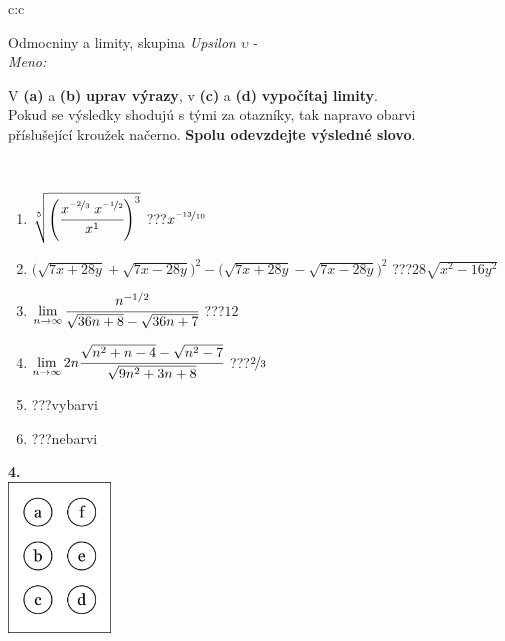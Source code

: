 \documentclass[10pt]{report}
\begin{document}
\begin{tabular}{c:c}
\begin{minipage}[c][104.5mm][t]{0.5\linewidth}
\begin{center}
\vspace{7mm}
{\huge Odmocniny a limity, skupina \textit{Upsilon $\upsilon$} -}\\[5mm]
\textit{Meno:}\phantom{xxxxxxxxxxxxxxxxxxxxxxxxxxxxxxxxxxxxxxxxxxxxxxxxxxxxxxxxxxxxxxxxx}\\[5mm]
\begin{minipage}{0.95\linewidth}
\begin{center}
V \textbf{(a)} a \textbf{(b)} \textbf{uprav výrazy}, v \textbf{(c)} a \textbf{(d)} \textbf{vypočítaj limity}.\\Pokud se výsledky shodujú s tými za otazníky, tak napravo obarvi\\příslušející kroužek načerno. \textbf{Spolu odevzdejte výsledné slovo}.
\end{center}
\end{minipage}
\\[1mm]
\begin{minipage}{0.79\linewidth}
\begin{center}
\begin{varwidth}{\linewidth}
\begin{enumerate}
\small
\item $\sqrt[5]{\left(\cfrac{x^{\nicefrac{-2}{3}}\;x^{\nicefrac{-1}{2}}}{x^{1}}\right)^{3}}$\quad \dotfill\; ???\;\dotfill \quad $x^{\nicefrac{-13}{10}}$
\item {\footnotesize{\scriptsize$\big(\sqrt{7x+28y}+\sqrt{7x-28y}\big)^2-\big(\sqrt{7x+28y}-\sqrt{7x-28y}\big)^2$}\quad \dotfill\; ???\;\dotfill \quad $28\sqrt{x^2-16y^2}$}
\item $\lim\limits_{n\to\infty}\cfrac{n^{-1/2}}{\sqrt{36n+8}-\sqrt{36n+7}}$\quad \dotfill\; ???\;\dotfill \quad $12$
\item $\lim\limits_{n\to\infty}2n\cfrac{\sqrt{n^2+n-4}-\sqrt{n^2-7}}{\sqrt{9n^2+3n+8}}$\quad \dotfill\; ???\;\dotfill \quad $\nicefrac{2}{3}$
\item \quad \dotfill\; ???\;\dotfill \quad vybarvi
\item \quad \dotfill\; ???\;\dotfill \quad nebarvi
\end{enumerate}
\end{varwidth}
\end{center}
\end{minipage}
\begin{minipage}{0.20\linewidth}
\begin{center}
{\Huge\bfseries 4.} \\[2mm]
\includegraphics[height=40mm]{../images/braille.png}

\end{center}
\end{minipage}
\end{center}
\end{minipage}
\end{tabular}
\end{document}
